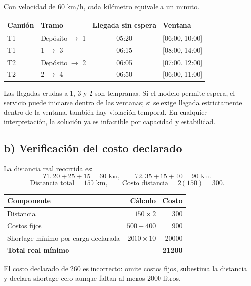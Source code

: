 \documentclass[11pt,letterpaper]{article}
\begin{document}
Con velocidad de 60 km/h, cada kilómetro equivale a un minuto.

\begin{table}[h]
\centering
\begin{tabular}{llcl}
\toprule
\textbf{Camión} & \textbf{Tramo} & \textbf{Llegada sin espera} & \textbf{Ventana} \\
\midrule
T1 & Depósito \(\to\) 1 & 05:20 & [06:00, 10:00] \\
T1 & 1 \(\to\) 3 & 06:15 & [08:00, 14:00] \\
T2 & Depósito \(\to\) 2 & 06:05 & [07:00, 12:00] \\
T2 & 2 \(\to\) 4 & 06:50 & [06:00, 11:00] \\
\bottomrule
\end{tabular}
\end{table}

Las llegadas crudas a 1, 3 y 2 son tempranas. Si el modelo permite espera, el servicio puede
iniciarse dentro de las ventanas; si se exige llegada estrictamente dentro de la ventana, también
hay violación temporal. En cualquier interpretación, la solución ya es infactible por capacidad
y estabilidad.

\subsection{b) Verificación del costo declarado}

La distancia real recorrida es:
\[
T1: 20+25+15=60\text{ km},\qquad
T2: 35+15+40=90\text{ km}.
\]
\[
\text{Distancia total}=150\text{ km},\qquad
\text{Costo distancia}=2(150)=300.
\]

\begin{table}[h]
\centering
\begin{tabular}{lrr}
\toprule
\textbf{Componente} & \textbf{Cálculo} & \textbf{Costo} \\
\midrule
Distancia & \(150\times2\) & 300 \\
Costos fijos & \(500+400\) & 900 \\
Shortage mínimo por carga declarada & \(2000\times10\) & 20000 \\
\midrule
\textbf{Total real mínimo} & & \textbf{21200} \\
\bottomrule
\end{tabular}
\end{table}

El costo declarado de 260 es incorrecto: omite costos fijos, subestima la distancia y declara
shortage cero aunque faltan al menos 2000 litros.
\end{document}
